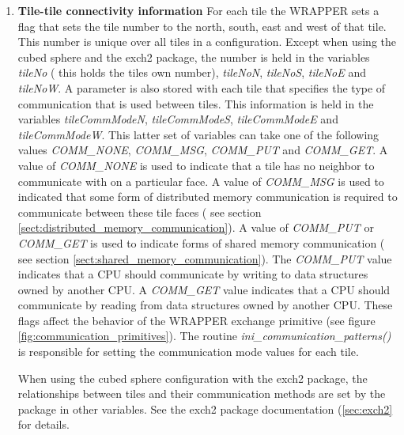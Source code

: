 \begin{enumerate}
\item {\bf Tile-tile connectivity information} 
For each tile the WRAPPER
sets a flag that sets the tile number to the north, 
south, east and
west of that tile. This number is unique over all tiles in a 
configuration. Except when using the cubed sphere and the exch2 package,
the number is held in the variables {\em tileNo}
( this holds the tiles own number), {\em tileNoN}, {\em tileNoS},
{\em tileNoE} and {\em tileNoW}. A parameter is also stored with each tile
that specifies the type of communication that is used between tiles.
This information is held in the variables {\em tileCommModeN},
{\em tileCommModeS}, {\em tileCommModeE} and {\em tileCommModeW}.
This latter set of variables can take one of the following values
{\em COMM\_NONE}, {\em COMM\_MSG}, {\em COMM\_PUT} and {\em COMM\_GET}.
A value of {\em COMM\_NONE} is used to indicate that a tile has no
neighbor to communicate with on a particular face. A value
of {\em COMM\_MSG} is used to indicated that some form of distributed
memory communication is required to communicate between
these tile faces ( see section \ref{sect:distributed_memory_communication}).
A value of {\em COMM\_PUT} or {\em COMM\_GET} is used to indicate 
forms of shared memory communication ( see section 
\ref{sect:shared_memory_communication}). The {\em COMM\_PUT} value indicates 
that a CPU should communicate by writing to data structures owned by another 
CPU. A {\em COMM\_GET} value indicates that a CPU should communicate by reading
from data structures owned by another CPU. These flags affect the behavior
of the WRAPPER exchange primitive 
(see figure \ref{fig:communication_primitives}). The routine 
{\em ini\_communication\_patterns()} is responsible for setting the
communication mode values for each tile.

When using the cubed sphere configuration with the exch2 package, the 
relationships between tiles and their communication methods are set 
by the package in other variables.  See the exch2 package documentation 
(\ref{sec:exch2} for details.



 \\


\end{enumerate}
